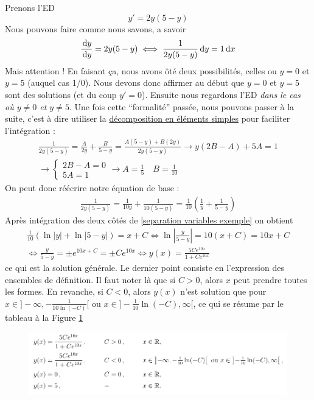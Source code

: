\documentclass[12pt,a4paper]{article}
\renewcommand{\)}{\right)}
\renewcommand{\(}{\left(}
\begin{document}
\begin{exemple}
	Prenons l'ED 
	\[y' = 2y(5-y)\]
	Nous pouvons faire comme nous savons, a savoir 
	\begin{equation}
	\frac{\, \mathrm d y}{\, \mathrm d y} = 2y(5-y) \iff \frac{1}{2y(5-y)} \, \mathrm d y = 1\, \mathrm d x
	\label{separation variables exemple}
	\end{equation}
	Mais attention ! En faisant ça, nous avons ôté deux possibilités, celles ou $y = 0$ et $y = 5$ (auquel cas 1/0). Nous devons donc affirmer au début que $y=0$ et $y = 5$ sont des solutions (et du coup $y' = 0$). Ensuite nous regardons l'ED \textit{dans le cas où $y \neq 0$ et $y \neq 5$}. Une fois cette \enquote{formalité} passée, nous pouvons passer à la suite, c'est à dire utiliser la \hyperref[elements simples]{décomposition en éléments simples} pour faciliter l'intégration : 
	\begin{align*}
	\frac{1}{2y(5-y)} = \frac{A}{2y} + \frac{B}{5-y} = \frac{A(5-y) + B(2y)}{2y(5-y)} \to y(2B-A)  + 5A = 1\\
	\to
	\left\{ \begin{array}{l}
	2B-A = 0\\
	5A = 1
	\end{array}\right. \to A = \frac{1}{5}\quad B =\frac{1}{10}
	\end{align*}
	On peut donc réécrire notre équation de base :
	\begin{align*}
		\frac{1}{2y(5-y)} = \frac{1}{10y} + \frac{1}{10(5-y)} = \frac{1}{10}\(\frac{1}{y} + \frac{1}{5-y}\)
	\end{align*}
	Après intégration des deux côtés de \eqref{separation variables exemple} on obtient 
	\begin{align*}
		\frac{1}{10}(\ln|y| + \ln|5-y|) = x + C \iff \ln\left|\frac{y}{5-y}\right| = 10(x + C) = 10x + C\\
		\iff \frac{y}{5-y} = \pm e^{10x + C} = \pm Ce^{10x} \iff y(x) = \frac{5Ce^{10x}}{1+Ce^{10x}}
	\end{align*}
	ce qui est la solution générale. Le dernier point consiste en l'expression des ensembles de définition. Il faut noter là que si $C > 0$, alors $x$ peut prendre toutes les formes. En revanche, si $C < 0$, alors $y(x)$ n'est solution que pour $x \in ]-\infty,-\frac{1}{10 \ln(-C)}[$ ou $x\in ]-\frac{1}{10}\ln(-C),\infty[$, ce qui se résume par le tableau à la Figure \ref{tab separation variables}
\end{exemple}
\begin{figure}[!h]
	\centering
	\includegraphics[scale=0.5]{separation_variable}
	\caption{}
	\label{tab separation variables}
\end{figure}
\end{document}

